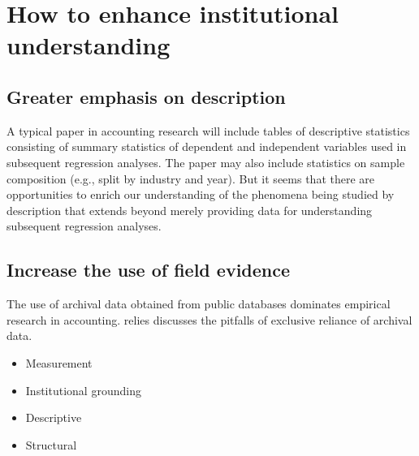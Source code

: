 \documentclass[11pt]{amsart}
\begin{document}
\section{How to enhance institutional understanding}

\subsection{Greater emphasis on description}
A typical paper in accounting research will include tables of descriptive statistics consisting of summary statistics of dependent and independent variables used in subsequent regression analyses. The paper may also include statistics on sample composition (e.g., split by industry and year). But it seems that there are opportunities to enrich our understanding of the phenomena being studied by description that extends beyond merely providing data for understanding subsequent regression analyses.

\subsection{Increase the use of field evidence}

The use of archival data obtained from public databases dominates empirical research in accounting. relies \cite{Soltes:2014gr} discusses the pitfalls of exclusive reliance of archival data. 


\begin{itemize}
\item Measurement
\item Institutional grounding
\item Descriptive
\item Structural
\end{itemize}



\end{document}
